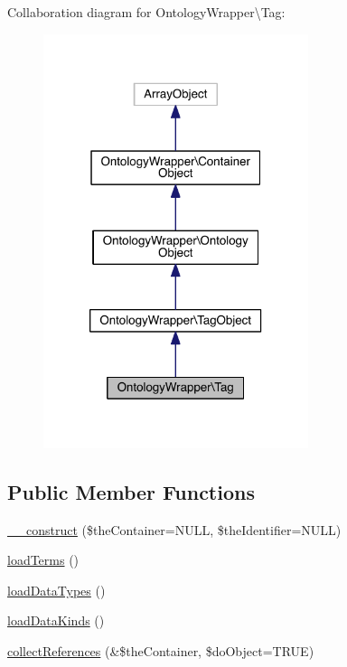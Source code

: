 Collaboration diagram for Ontology\-Wrapper\textbackslash{}Tag\-:\nopagebreak
\begin{figure}[H]
\begin{center}
\leavevmode
\includegraphics[width=220pt]{class_ontology_wrapper_1_1_tag__coll__graph}
\end{center}
\end{figure}
\subsection*{Public Member Functions}
\begin{DoxyCompactItemize}
\item 
\hyperlink{class_ontology_wrapper_1_1_tag_aa1e0088ed61d741f3679c3a3128007b1}{\-\_\-\-\_\-construct} (\$the\-Container=N\-U\-L\-L, \$the\-Identifier=N\-U\-L\-L)
\item 
\hyperlink{class_ontology_wrapper_1_1_tag_aa2e64f9c1b9f4cd55e5f31db154057b7}{load\-Terms} ()
\item 
\hyperlink{class_ontology_wrapper_1_1_tag_a8fafe8f4c5ac0208e0428a857d291103}{load\-Data\-Types} ()
\item 
\hyperlink{class_ontology_wrapper_1_1_tag_aaf0f041294cc04e07c0e92640e7544e7}{load\-Data\-Kinds} ()
\item 
\hyperlink{class_ontology_wrapper_1_1_tag_af565f8f24f7dff4ce1c3f40e9953345b}{collect\-References} (\&\$the\-Container, \$do\-Object=T\-R\-U\-E)
\end{DoxyCompactItemize}
